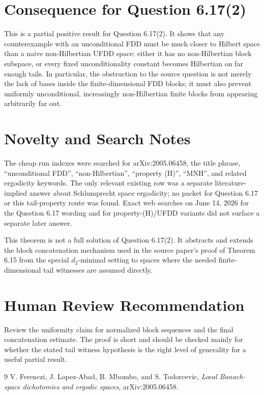 \documentclass[11pt]{article}
\begin{document}
\section*{Consequence for Question 6.17(2)}

This is a partial positive result for Question 6.17(2). It shows that any
counterexample with an unconditional FDD must be much closer to Hilbert space
than a naive non-Hilbertian UFDD space: either it has no non-Hilbertian block
subspace, or every fixed unconditionality constant becomes Hilbertian on far
enough tails. In particular, the obstruction to the source question is not
merely the lack of bases inside the finite-dimensional FDD blocks; it must
also prevent uniformly unconditional, increasingly non-Hilbertian finite
blocks from appearing arbitrarily far out.

\section*{Novelty and Search Notes}

The cheap run indexes were searched for arXiv:2005.06458, the title phrase,
``unconditional FDD'', ``non-Hilbertian'', ``property (H)'', ``MNH'', and
related ergodicity keywords. The only relevant existing row was a separate
literature-implied answer about Schlumprecht space ergodicity; no packet for
Question 6.17 or this tail-property route was found. Exact web searches on
June 14, 2026 for the Question 6.17 wording and for property-(H)/UFDD variants
did not surface a separate later answer.

This theorem is not a full solution of Question 6.17(2). It abstracts and
extends the block concatenation mechanism used in the source paper's proof of
Theorem 6.15 from the special \(d_2\)-minimal setting to spaces where the
needed finite-dimensional tail witnesses are assumed directly.

\section*{Human Review Recommendation}

Review the uniformity claim for normalized block sequences and the final
concatenation estimate. The proof is short and should be checked mainly for
whether the stated tail witness hypothesis is the right level of generality
for a useful partial result.

\begin{thebibliography}{9}
V. Ferenczi, J. Lopez-Abad, B. Mbombo, and S. Todorcevic,
\emph{Local Banach-space dichotomies and ergodic spaces},
arXiv:2005.06458.
\end{thebibliography}
\end{document}
